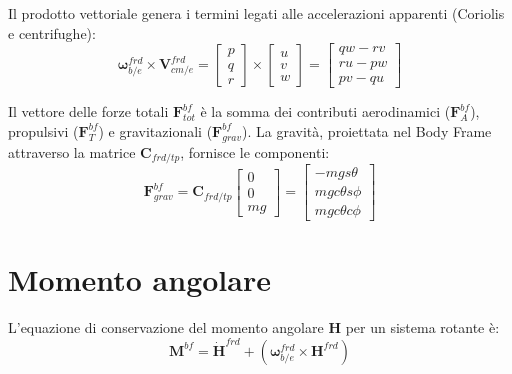 Il prodotto vettoriale genera i termini legati alle accelerazioni apparenti (Coriolis e centrifughe):
\begin{equation}
\boldsymbol{\omega}_{b/e}^{frd} \times \mathbf{V}_{cm/e}^{frd} = 
\begin{bmatrix} p \\ q \\ r \end{bmatrix} \times \begin{bmatrix} u \\ v \\ w \end{bmatrix} = 
\begin{bmatrix} qw - rv \\ ru - pw \\ pv - qu \end{bmatrix}
\end{equation}

Il vettore delle forze totali $\mathbf{F}_{tot}^{bf}$ è la somma dei contributi aerodinamici ($\mathbf{F}_A^{bf}$), propulsivi ($\mathbf{F}_T^{bf}$) e gravitazionali ($\mathbf{F}_{grav}^{bf}$). La gravità, proiettata nel Body Frame attraverso la matrice $\mathbf{C}_{frd/tp}$, fornisce le componenti:
\begin{equation}
\mathbf{F}_{grav}^{bf} = \mathbf{C}_{frd/tp} \begin{bmatrix} 0 \\ 0 \\ mg \end{bmatrix} = 
\begin{bmatrix} -mg s\theta \\ mg c\theta s\phi \\ mg c\theta c\phi \end{bmatrix}
\end{equation}

\section{Momento angolare}
L'equazione di conservazione del momento angolare $\mathbf{H}$ per un sistema rotante è:
\begin{equation}
\mathbf{M}^{bf} = \dot{\mathbf{H}}^{frd} + \left( \boldsymbol{\omega}_{b/e}^{frd} \times \mathbf{H}^{frd} \right)
\end{equation}

